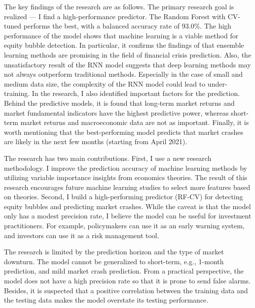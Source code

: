 \documentclass[12pt, man, a4paper, floatsintext]{apa7}
\begin{document}
The key findings of the research are as follows. The primary research goal is realized — I find a high-performance predictor. The Random Forest with CV-tuned performs the best, with a balanced accuracy rate of 93.0\%. The high performance of the model shows that machine learning is a viable method for equity bubble detection. In particular, it confirms the findings of \textcite{LinSurvey} that ensemble learning methods are promising in the field of financial crisis prediction. Also, the unsatisfactory result of the RNN model suggests that deep learning methods may not always outperform traditional methods. Especially in the case of small and medium data size, the complexity of the RNN model could lead to under-training. In the research, I also identified important factors for the prediction. Behind the predictive models, it is found that long-term market returns and market fundamental indicators have the highest predictive power, whereas short-term market returns and macroeconomic data are not as important. Finally, it is worth mentioning that the best-performing model predicts that market crashes are likely in the next few months (starting from April 2021).

The research has two main contributions. First, I use a new research methodology. I improve the prediction accuracy of machine learning methods by utilizing variable importance insights from economics theories. The result of this research encourages future machine learning studies to select more features based on theories. Second, I build a high-performing predictor (RF-CV) for detecting equity bubbles and predicting market crashes. While the caveat is that the model only has a modest precision rate, I believe the model can be useful for investment practitioners. For example, policymakers can use it as an early warning system, and investors can use it as a risk management tool.

The research is limited by the prediction horizon and the type of market downturn. The model cannot be generalized to short-term, e.g., 1-month prediction, and mild market crash prediction. From a practical perspective, the model does not have a high precision rate so that it is prone to send false alarms. Besides, it is suspected that a positive correlation between the training data and the testing data makes the model overstate its testing performance. 
\end{document}
